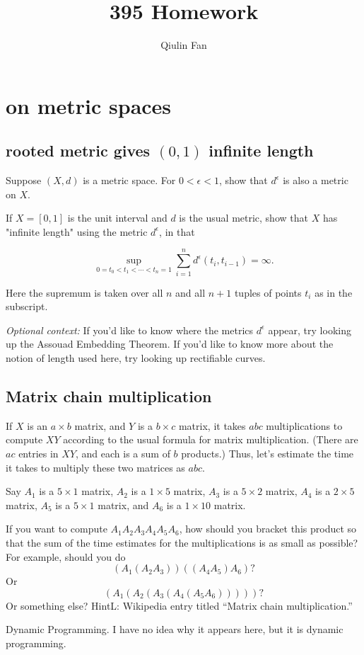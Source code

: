 \documentclass[lang=cn,11pt]{template}
\title{395 Homework}
\author{Qiulin Fan}
\begin{document}
   
\frontmatter
\tableofcontents
\mainmatter



\chapter{on metric spaces}

\section{rooted metric gives $(0,1)$ infinite length}
Suppose \((X, d)\) is a metric space. For \(0 < \epsilon < 1\), show that \(d^\epsilon\) is also a metric on \(X\).

If \(X = [0, 1]\) is the unit interval and \(d\) is the usual metric, show that \(X\) has "infinite length" using the metric \(d^\epsilon\), in that

\[
\sup_{0 = t_0 < t_1 < \cdots < t_n = 1} \sum_{i=1}^{n} d^\epsilon(t_i, t_{i-1}) = \infty.
\]

Here the supremum is taken over all \(n\) and all \(n + 1\) tuples of points \(t_i\) as in the subscript.

\textit{Optional context:} If you’d like to know where the metrics \(d^\epsilon\) appear, try looking up the Assouad Embedding Theorem. If you’d like to know more about the notion of length used here, try looking up rectifiable curves.



\section{Matrix chain multiplication}
If \(X\) is an \(a \times b\) matrix, and \(Y\) is a \(b \times c\) matrix, it takes \(abc\) multiplications to compute \(XY\) according to the usual formula for matrix multiplication. (There are \(ac\) entries in \(XY\), and each is a sum of \(b\) products.) Thus, let’s estimate the time it takes to multiply these two matrices as \(abc\).

Say \(A_1\) is a \(5 \times 1\) matrix, \(A_2\) is a \(1 \times 5\) matrix, \(A_3\) is a \(5 \times 2\) matrix, \(A_4\) is a \(2 \times 5\) matrix, \(A_5\) is a \(5 \times 1\) matrix, and \(A_6\) is a \(1 \times 10\) matrix.

If you want to compute \(A_1 A_2 A_3 A_4 A_5 A_6\), how should you bracket this product so that the sum of the time estimates for the multiplications is as small as possible? For example, should you do
\[
(A_1 (A_2 A_3)) ((A_4 A_5) A_6)?
\]
Or
\[
(A_1 (A_2 (A_3 (A_4 (A_5 A_6)))))?
\]
Or something else?
HintL: Wikipedia entry titled “Matrix chain multiplication.”
\begin{solution}
    Dynamic Programming. I have no idea why it appears here, but it is dynamic programming.
\end{solution}
\end{document}
